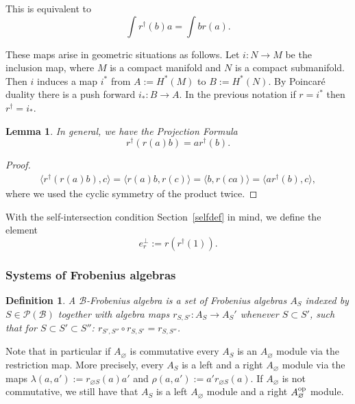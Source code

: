 \documentclass[pdftex]{sigma}
\newtheorem{lem}[thm]{Lemma}
\newtheorem{df}[thm]{Definition}
\def\calB{{\mathcal B}}
\def\calP{{\mathcal P}}
\def\la{\langle}
\def\ra{\rangle}
\begin{document}
This is equivalent to
\begin{equation}
\label{adjointeq}
 \int r^{\dagger}(b)a  =\int br(a).
\end{equation}

These maps arise
in geometric situations as follows. Let $i:N \to M $ be the inclusion map, where $M$ is a compact manifold and $N$ is a compact submanifold. Then $i$ induces a map $i^*$ from
$A:=H^*(M)$ to $B:=H^*(N)$. By Poincar\'e duality there is a push forward $i_*:B\to A$. In the previous notation if  $r=i^*$ then $r^{\dagger}=i_*$.


\begin{lem}In general, we have the Projection Formula
\begin{equation*}
r^{\dagger}(r(a)b)=ar^{\dagger}(b). %
\end{equation*}
\end{lem}
\begin{proof}
\begin{gather*}
\la r^{\dagger}(r(a)b), c\ra = \la r(a)b,r(c)\ra = \la b, r(ca)\ra = \la ar^{\dagger}(b),c\ra,
\end{gather*}
where we used the cyclic symmetry of the product twice.
\end{proof}

With  the self-intersection condition Section~\ref{selfdef} in mind, we def\/ine the element
\begin{equation*}
e_r^{\perp}:=r (r^{\dagger}(1)).
\end{equation*}

\subsubsection{Systems of Frobenius algebras}
\begin{df} A $\calB$-Frobenius algebra is a set of Frobenius
algebras $A_S$ indexed by $S\in \calP(\calB)$ together with algebra maps
$r_{S,S'}:A_S\to A_S'$ whenever $S\subset S'$,
such that for $S\subset S'\subset S''$: $r_{S',S''}\circ r_{S,S'}=r_{S,S''}$.
\end{df}



Note that in particular if $A_{\varnothing}$ is commutative
every $A_S$ is an $A_{\varnothing}$ module via
the restriction map. More precisely,  every $A_S$ is a left and a right $A_{\varnothing}$
module via the maps $\lambda (a,a'):= r_{\varnothing S}(a)a'$
and $\rho(a,a') :=a' r_{\varnothing S}(a)$. If $A_{\varnothing}$ is not commutative,
we still have that $A_S$ is a left $A_{\varnothing}$ module and a right $A_{\varnothing}^{\rm op}$ module.
\end{document}
